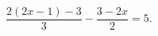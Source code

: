 \begin{ex}[type=equation]
	\begin{condition}
		$\dfrac{2(2x - 1) - 3}{3}-\dfrac{3 - 2x}{2} = 5.$
	\end{condition}
\end{ex}